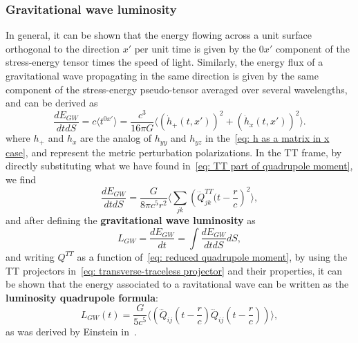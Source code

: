 \subsubsection{Gravitational wave luminosity}
In general, it can be shown that the energy flowing across a unit surface orthogonal to the direction $x'$ per unit time is given by the $0x'$ component of the stress-energy tensor times the speed of light.
Similarly, the energy flux of a gravitational wave propagating in the same direction is given by the same component of the stress-energy pseudo-tensor averaged over several wavelengths, and can be derived as
\[
    \frac{dE_{GW}}{dtdS} = c\langle t^{0x'}\rangle = \frac{c^3}{16\pi G}\langle (\dot{h}_+(t,x'))^2 + (\dot{h}_x(t,x'))^2 \rangle.
\]
where $h_+$ and $h_x$ are the analog of $h_{yy}$ and $h_{yz}$ in the~\eqref{eq: h as a matrix in x case}, and represent the metric perturbation polarizations.
In the TT frame, by directly substituting what we have found in~\eqref{eq: TT part of quadrupole moment}, we find 
\[
\frac{dE_{GW}}{dtdS} = \frac{G}{8\pi c^5 r^2}\Big\langle \sum_{jk}\left( \dddot{Q}_{jk}^{TT}(t-\frac{r}{c} \right)^2 \Big\rangle,
\]
and after defining the \textbf{gravitational wave luminosity} as
\[
    L_{GW} = \frac{dE_{GW}}{dt} = \int \frac{dE_{GW}}{dtdS}dS,
\]
and writing $Q^{TT}$ as a function of~\eqref{eq: reduced quadrupole moment}, by using the TT projectors in~\eqref{eq: transverse-traceless projector} and their properties, it can be shown that the energy associated to a ravitational wave can be written as the \textbf{luminosity quadrupole formula}:
\begin{equation}
    L_{GW}(t) = \frac{G}{5c^5}\Big\langle \left(\dddot{Q}_{ij}\left(t- \frac{r}{c}\right) \dddot{Q}_{ij}\left(t-\frac{r}{c}\right)\right) \Big\rangle,
    \label{eq: luminosity quadrupole formula}
\end{equation}
as was derived by Einstein in~\cite{Einstein_1918}.


